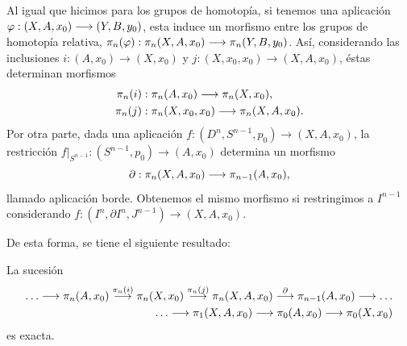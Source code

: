 Al igual que hicimos para los grupos de homotopía, si tenemos una aplicación $\varphi :\nobreak  (X, A, x_0) \longrightarrow (Y, B, y_0)$, esta induce un morfismo entre los grupos de homotopía relativa, $\homot{n}{\varphi} : \homot{n}{X, A, x_0} \longrightarrow \homot{n}{Y,B,y_0}$. Así, considerando las inclusiones $i : (A, x_0) \longrightarrow (X, x_0)$ y $j: (X, x_0, x_0) \longrightarrow (X, A, x_0)$, éstas determinan morfismos
\begin{align*}
\homot{n}{i}&: \homot{n}{A, x_0} \longrightarrow \homot{n}{X, x_0}, \\
\homot{n}{j}&: \homot{n}{X, x_0, x_0} \longrightarrow \homot{n}{X, A, x_0}.
\end{align*}
Por otra parte, dada una aplicación $f: (D^n, S^{n-1}, p_0) \longrightarrow (X, A, x_0)$, la restricción $f \vert_{S^{n-1}} : (S^{n-1}, p_0) \longrightarrow (A, x_0)$ determina un morfismo 
\[
\partial : \homot{n}{X, A, x_0} \longrightarrow \homot{n-1}{A, x_0},
\]
llamado aplicación borde. Obtenemos el mismo morfismo si restringimos a $I ^{n-1}$ considerando $f : (I^n, \partial I^n, J^{n-1}) \longrightarrow (X, A, x_0)$.\par
De esta forma, se tiene el siguiente resultado:
\begin{teor}
La sucesión
\begin{align*} 
\ldots \longrightarrow \homot{n}{A, x_0} \stackrel{\homot{n}{i}}{\longrightarrow} \homot{n}{X, x_0} \stackrel{\homot{n}{j}}{\longrightarrow} \homot{n}{X, A, x_0} \stackrel{\partial}{\longrightarrow} \homot{n-1}{A, x_0} \longrightarrow \ldots \\
\ldots \longrightarrow \homot{1}{X, A, x_0} \longrightarrow \homot{0}{A, x_0} \longrightarrow \homot{0}{X, x_0}
\end{align*}
es exacta.
\end{teor}
